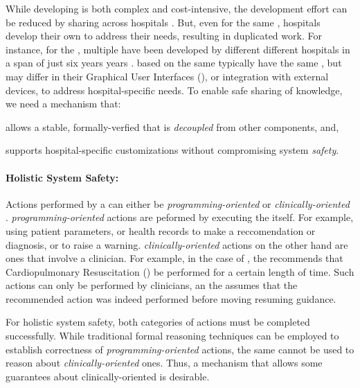 While developing \CGSs{} is both complex and cost-intensive,
the development effort can be reduced by sharing \CGSs{} across hospitals \cite{PelegAMIA00}.
But, even for the same \BPG{}, hospitals develop their own \CGSs{} to address
their needs, resulting in duplicated work.
For instance, for the \ACLS{} \BPG{}, multiple \CGSs{} have been developed by different
different hospitals in a span of just six years years \cite{FullCodePro,PediAppRREST2020,
PediAppRREST2021,GuidingPad2017,GuidingPad2019, GuidingPad2020,DST2014,DST2019,ROSCo2021,TeamScreen2019,Wu2017}.
\CGSs{} based on the same \BPG{} typically have the same \CIG{}, but may differ
in their Graphical User Interfaces (\GUIs), or integration with external
devices, to address hospital-specific needs.
To enable safe sharing of knowledge, we need a mechanism that:
\begin{enumerate*}[label=(\alph*)]
  \item allows a stable, formally-verfied \CIG{} that is \emph{decoupled} from other
    components, and,
  \item supports hospital-specific customizations without compromising system
    \emph{safety}.
\end{enumerate*}

\paragraph{Holistic System Safety:}

Actions performed by a \CGS{} can either be \emph{programming-oriented}
or \emph{clinically-oriented} \cite{BoxwalaJBI04}. \emph{programming-oriented}
actions are peformed by executing the \CIG{} itself. For example,
using patient parameters, or health records to make a reccomendation or diagnosis,
or to raise a warning. \emph{clinically-oriented} actions on the other hand
are ones that involve a clinician. For example, in the case of \ACLS{},
the \CGS{} recommends that Cardiopulmonary Resuscitation (\CPR{}) be performed
for a certain length of time. Such actions can only be performed by clinicians,
an the \CGS{} assumes that the recommended action was indeed performed before
moving resuming guidance.

For holistic system safety, both categories of actions must be completed
successfully. While traditional formal reasoning techniques can be employed
to establish correctness of \emph{programming-oriented} actions, the same
cannot be used to reason about \emph{clinically-oriented} ones.
Thus, a mechanism that allows some guarantees about clinically-oriented is
desirable.


